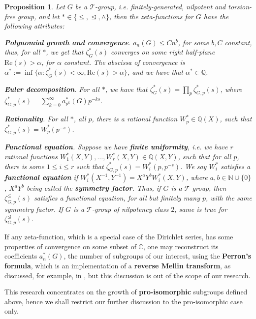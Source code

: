\documentclass[12pt]{article}
\newtheorem{proposition}[theorem]{Proposition}
\begin{document}
\begin{proposition}
Let $G$ be a $\mathcal{T}$-group, i.e. finitely-generated, nilpotent and torsion-free group, and let $\ast\in\{\leq,\trianglelefteq,\wedge\}$, then the zeta-functions for $G$ have the following attributes:\par
\textbf{Polynomial growth and convergence}. $a_{n}(G)\leq{C}n^{b}$, for some $b,C$ constant, thus, for all $\ast$, we get that $\zeta_{G}^{\ast}(s)$ converges on some right half-plane $\mathrm{Re}(s)>\alpha$, for $\alpha$ constant. The abscissa of convergence is $\alpha^{\ast}:=\inf\{\alpha : \zeta_{G}^{\ast}(s)<\infty,\mathrm{Re}(s)>\alpha\}$, and we have that $\alpha^{\ast}\in\mathbb{Q}$.\par
\textbf{Euler decomposition}.
For all $\ast$, we have that $\zeta_{G}^{\ast}(s)=\prod_{p}\zeta_{G,p}^{\ast}(s)$, where $\zeta_{G,p}^{\ast}(s)=\sum_{k=0}^{\infty}a_{p^k}^{\ast}(G)p^{-ks}$.\par
\textbf{Rationality}. For all $\ast$, all $p$, there is a rational function $W_{p}^{\ast}\in\mathbb{Q}(X)$, such that $\zeta_{G,p}^{\ast}(s)=W_{p}^{\ast}(p^{-s})$.\par
\textbf{Functional equation}. Suppose we have \textbf{finite uniformity}, i.e. we have $r$ rational functions $W_{1}^{\ast}(X,Y),\dots,W_{r}^{\ast}(X,Y)\in\mathbb{Q}(X,Y)$, such that for all $p$, there is some $1\leq{i}\leq{r}$ such that $\zeta_{G,p}^{\ast}(s)=W_{i}^{\ast}(p,p^{-s})$. We say $W_{i}^{\ast}$ satisfies a \textbf{functional equation} if $W_{i}^{\ast}(X^{-1},Y^{-1})=X^{a}Y^{b}{W_{i}^{\ast}(X,Y)}$, where $a,b\in\mathbb{N}\cup\{0\}$, $X^{a}Y^{b}$ being called the \textbf{symmetry factor}. Thus,
if $G$ is a $\mathcal{T}$-group, then $\zeta_{G,p}^{\leq}(s)$ satisfies a functional equation, for all but finitely many $p$, with the same symmetry factor. If $G$ is a $\mathcal{T}$-group of nilpotency class $2$, same is true for $\zeta_{G,p}^{\trianglelefteq}(s)$.
\end{proposition}
If any zeta-function, which is a special case of the Dirichlet series, has some properties of convergence on some subset of $\mathbb{C}$, one may reconstruct its coefficients $a_{n}^{\ast}(G)$, the number of subgroups of our interest, using the \textbf{Perron's formula}, which is an implementation of a \textbf{reverse Mellin transform}, as discussed, for example, in \cite{MontgomeryVaughan}, but this discussion is out of the scope of our research.\par
This research concentrates on the growth of \textbf{pro-isomorphic} subgroups defined above, hence we shall restrict our further discussion to the pro-isomorphic case only.
\end{document}
